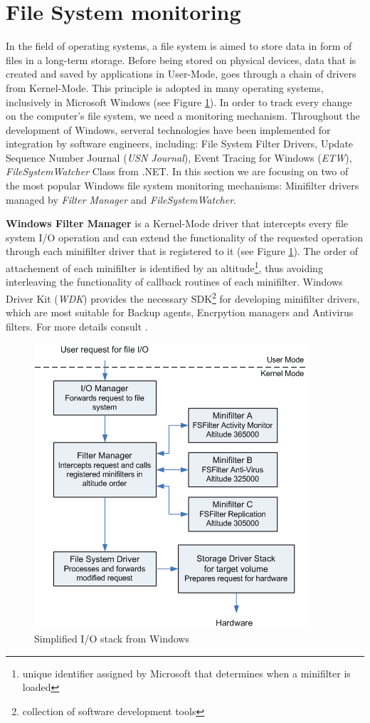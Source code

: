 \section{File System monitoring}
\label{section:filesystem}
In the field of operating systems, a file system is aimed to store data in form of files in a long-term storage. Before being stored on physical devices, data that is created and saved by applications in User-Mode, goes through a chain of drivers from Kernel-Mode. This principle is adopted in many operating systems, inclusively in Microsoft Windows (see Figure \ref{filterDriver}). In order to track every change on the computer's file system, we need a monitoring mechanism. Throughout the development of Windows, serveral technologies have been implemented for integration by software engineers, including: File System Filter Drivers, Update Sequence Number Journal (\textit{USN Journal}), Event Tracing for Windows (\textit{ETW}), \textit{FileSystemWatcher} Class from .NET. In this section we are focusing on two of the most popular Windows file system monitoring mechanisms: Minifilter drivers managed by \textit{Filter Manager} and \textit{FileSystemWatcher}. \par
\textbf{Windows Filter Manager} is a Kernel-Mode driver that intercepts every file system I/O operation and can extend the functionality of the requested operation through each minifilter driver that is registered to it (see Figure \ref{filterDriver}). The order of attachement of each minifilter is identified by an altitude\footnote{unique identifier assigned by Microsoft that determines when a minifilter is loaded}, thus avoiding interleaving the functionality of callback routines of each minifilter. Windows Driver Kit (\textit{WDK}) provides the necessary SDK\footnote{collection of software development tools} for developing minifilter drivers, which are most suitable for Backup agents, Encrpytion managers and Antivirus filters. For more details consult \cite{msdn}. \par

\begin{figure}[H]
	\centerline{\includegraphics[scale=0.6]{figures/filterDriver.png}}  
	\caption{Simplified I/O stack from Windows \cite{msdn}}
	\label{filterDriver}
\end{figure}

